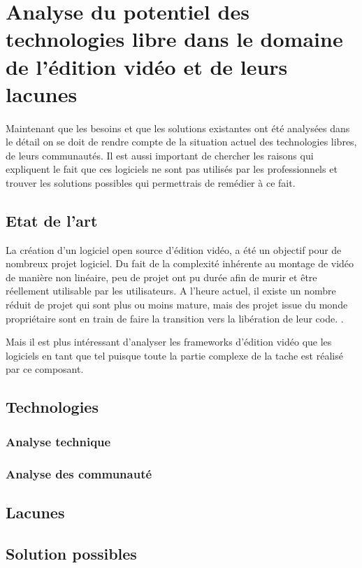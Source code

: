\newpage
\section{Analyse du potentiel des technologies libre dans le domaine de l'édition
vidéo et de leurs lacunes}

\paragraph{}
    Maintenant que les besoins et que les solutions existantes ont été
    analysées dans le détail on se doit de rendre compte de la situation
    actuel des technologies libres, de leurs communautés. Il est aussi
    important de chercher les raisons qui expliquent le fait que ces
    logiciels ne sont pas utilisés par les professionnels et trouver
    les solutions possibles qui permettrais de remédier à ce fait.

  \subsection{Etat de l'art}
      La création d'un logiciel open source d'édition vidéo, a
      été un objectif pour de nombreux projet logiciel. Du fait de
      la complexité inhérente au montage de vidéo de manière non
      linéaire, peu de projet ont pu durée afin de murir et être
      réellement utilisable par les utilisateurs. A l'heure actuel, il
      existe un nombre réduit de projet qui sont plus ou moins mature,
      mais des projet issue du monde propriétaire sont en train de faire
      la transition vers la libération de leur code. \cite{XXXXXXXXX}.

      Mais il est plus intéressant d'analyser les frameworks d'édition
      vidéo  que les logiciels en tant que tel puisque toute la partie
      complexe de la tache est réalisé par ce composant.

  \subsection{Technologies}
    \subsubsection{Analyse technique}
    \subsubsection{Analyse des communauté}
  \subsection{Lacunes}
  \subsection{Solution possibles}

